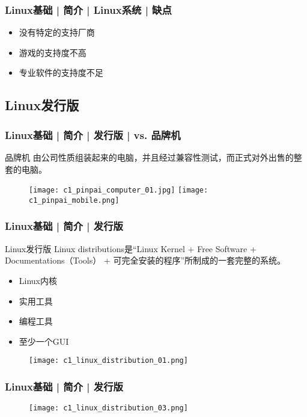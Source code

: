 \begin{frame}
  \frametitle{Linux基础 | 简介 | Linux系统 | 缺点}
  \begin{itemize}
    \item 没有特定的支持厂商
    \item 游戏的支持度不高
    \item 专业软件的支持度不足
  \end{itemize}
\end{frame}

\subsection{Linux发行版}
\begin{frame}
  \frametitle{Linux基础 | 简介 | 发行版 | vs. 品牌机}
  \begin{block}{品牌机}
    由公司性质组装起来的电脑，并且经过兼容性测试，而正式对外出售的整套的电脑。
  \end{block}
  \begin{figure}
    \centering
    \texttt{[image: c1\_pinpai\_computer\_01.jpg]}
    \texttt{[image: c1\_pinpai\_mobile.png]}
  \end{figure}
\end{frame}

\begin{frame}
  \frametitle{Linux基础 | 简介 | 发行版}
  \begin{block}{Linux发行版}
    Linux distributions是“Linux Kernel + Free Software + Documentations（Tools） + 可完全安装的程序”所制成的一套完整的系统。
    \begin{itemize}
      \item Linux内核
      \item 实用工具
      \item 编程工具
      \item 至少一个GUI
    \end{itemize}
  \end{block}
  \pause
  \begin{figure}
    \centering
    \texttt{[image: c1\_linux\_distribution\_01.png]}
  \end{figure}
\end{frame}

\begin{frame}
  \frametitle{Linux基础 | 简介 | 发行版}
  \begin{figure}
    \centering
    \texttt{[image: c1\_linux\_distribution\_03.png]}
  \end{figure}
\end{frame}

